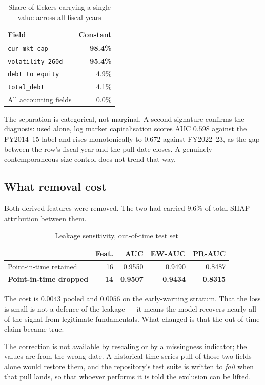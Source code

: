 \documentclass[conference]{IEEEtran}
\begin{document}
\begin{table}[htbp]
\caption{Share of tickers carrying a single value across all fiscal years}
\label{tab:pit}
\centering
\begin{tabular}{lr}
\toprule
Field & Constant \\
\midrule
\texttt{cur\_mkt\_cap} & \textbf{98.4\%} \\
\texttt{volatility\_260d} & \textbf{95.4\%} \\
\texttt{debt\_to\_equity} & 4.9\% \\
\texttt{total\_debt} & 4.1\% \\
All accounting fields & 0.0\% \\
\bottomrule
\end{tabular}
\end{table}

The separation is categorical, not marginal. A second signature confirms the
diagnosis: used alone, log market capitalisation scores AUC $0.598$ against the
FY2014--15 label and rises monotonically to $0.672$ against FY2022--23, as the
gap between the row's fiscal year and the pull date closes. A genuinely
contemporaneous size control does not trend that way.

\subsection{What removal cost}
Both derived features were removed. The two had carried 9.6\% of total SHAP
attribution between them.

\begin{table}[htbp]
\caption{Leakage sensitivity, out-of-time test set}
\label{tab:leak}
\centering
\begin{tabular}{lrrrr}
\toprule
 & Feat. & AUC & EW-AUC & PR-AUC \\
\midrule
Point-in-time retained & 16 & 0.9550 & 0.9490 & 0.8487 \\
\textbf{Point-in-time dropped} & \textbf{14} & \textbf{0.9507} & \textbf{0.9434} & \textbf{0.8315} \\
\bottomrule
\end{tabular}
\end{table}

The cost is $0.0043$ pooled and $0.0056$ on the early-warning stratum. That the
loss is small is not a defence of the leakage --- it means the model recovers
nearly all of the signal from legitimate fundamentals. What changed is that the
out-of-time claim became true.

The correction is not available by rescaling or by a missingness indicator; the
values are from the wrong date. A historical time-series pull of those two
fields alone would restore them, and the repository's test suite is written to
\emph{fail} when that pull lands, so that whoever performs it is told the
exclusion can be lifted.
\end{document}

